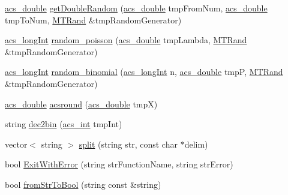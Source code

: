 \begin{DoxyCompactItemize}
\item 
\hyperlink{a00050_ab776853a005fcbf56af0424a2a4dd607}{acs\+\_\+double} \hyperlink{a00058_aed308af1d3ee40e106e4e23e78644d07}{get\+Double\+Random} (\hyperlink{a00050_ab776853a005fcbf56af0424a2a4dd607}{acs\+\_\+double} tmp\+From\+Num, \hyperlink{a00050_ab776853a005fcbf56af0424a2a4dd607}{acs\+\_\+double} tmp\+To\+Num, \hyperlink{a00015}{M\+T\+Rand} \&tmp\+Random\+Generator)
\item 
\hyperlink{a00050_a19319d75f02db4308bc5c0026d98cd85}{acs\+\_\+long\+Int} \hyperlink{a00058_a22cddb6ffcf2250e0c90bc913728350f}{random\+\_\+poisson} (\hyperlink{a00050_ab776853a005fcbf56af0424a2a4dd607}{acs\+\_\+double} tmp\+Lambda, \hyperlink{a00015}{M\+T\+Rand} \&tmp\+Random\+Generator)
\item 
\hyperlink{a00050_a19319d75f02db4308bc5c0026d98cd85}{acs\+\_\+long\+Int} \hyperlink{a00058_a78d5b4a67b6e66b8ceaa85874a2a12b7}{random\+\_\+binomial} (\hyperlink{a00050_a19319d75f02db4308bc5c0026d98cd85}{acs\+\_\+long\+Int} n, \hyperlink{a00050_ab776853a005fcbf56af0424a2a4dd607}{acs\+\_\+double} tmp\+P, \hyperlink{a00015}{M\+T\+Rand} \&tmp\+Random\+Generator)
\item 
\hyperlink{a00050_ab776853a005fcbf56af0424a2a4dd607}{acs\+\_\+double} \hyperlink{a00058_a277c801cb0f8a290d7c28b6a67feff18}{acsround} (\hyperlink{a00050_ab776853a005fcbf56af0424a2a4dd607}{acs\+\_\+double} tmp\+X)
\item 
string \hyperlink{a00058_a1a13653eb649b6fc74090deecddf1028}{dec2bin} (\hyperlink{a00050_a8d277355641a098190360234e2ebde35}{acs\+\_\+int} tmp\+Int)
\item 
vector$<$ string $>$ \hyperlink{a00058_a4d1aa74fac80ae0275c056575fdb6626}{split} (string str, const char $\ast$delim)
\item 
bool \hyperlink{a00058_aa678d0a98232158c48108227b98de4b6}{Exit\+With\+Error} (string str\+Function\+Name, string str\+Error)
\item 
bool \hyperlink{a00058_aed580149796de6350e6fcfae9b2adb30}{from\+Str\+To\+Bool} (string const \&string)
\end{DoxyCompactItemize}


